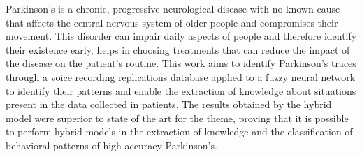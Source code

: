 
Parkinson's is a chronic, progressive neurological disease with no known cause that affects the central nervous system of older people and compromises their movement. This disorder can impair daily aspects of people and therefore identify their existence early, helps in choosing treatments that can reduce the impact of the disease on the patient's routine. This work aims to identify Parkinson's traces through a voice recording replications database applied to a fuzzy neural network to identify their patterns and enable the extraction of knowledge about situations present in the data collected in patients. The results obtained by the hybrid model were superior to state of the art for the theme, proving that it is possible to perform hybrid models in the extraction of knowledge and the classification of behavioral patterns of high accuracy Parkinson's.



